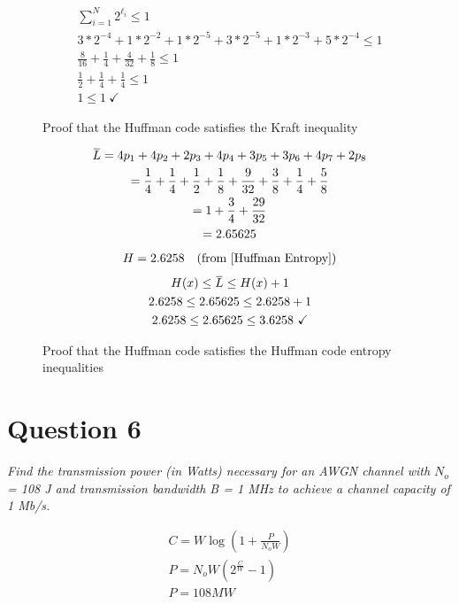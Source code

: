 \documentclass[12pt]{report}
\newcommand{\overbar}[1]{\mkern 1.5mu\overline{\mkern-1.5mu#1\mkern-1.5mu}\mkern 1.5mu} %
\begin{document}
\begin{figure}[H]
    \begin{gather}
        \sum_{i=1}^{N} 2^{\ell_i} \leq 1 \\
        3*2^{-4} + 1*2^{-2} + 1*2^{-5} + 3*2^{-5} + 1*2^{-3} + 5*2^{-4} \leq 1 \\
        \frac{8}{16} + \frac{1}{4} + \frac{4}{32} + \frac{1}{8} \leq 1 \\
        \frac{1}{2} + \frac{1}{4} + \frac{1}{4} \leq 1 \\
        1 \leq 1 \ \checkmark
    \end{gather}
    \caption{Proof that the Huffman code satisfies the Kraft inequality}
\end{figure}

\begin{figure}[H]
    \begin{gather}
        \overbar{L} = 4p_1 + 4p_2 + 2p_3 + 4p_4 + 3p_5 + 3p_6 + 4p_7 + 2p_8 \\
        = \frac{1}{4} + \frac{1}{4} + \frac{1}{2} + \frac{1}{8} + \frac{9}{32} + \frac{3}{8} + \frac{1}{4} + \frac{5}{8} \\
        = 1 + \frac{3}{4} + \frac{29}{32} \\
        = 2.65625
    \end{gather}
    \begin{gather*}
        H = 2.6258 \quad 
        (\text{from \ref{Huffman Entropy}})
    \end{gather*}
    \begin{gather}
        H(x) \leq \overbar{L} \leq H(x) + 1 \\
        2.6258 \leq 2.65625 \leq 2.6258 + 1 \\
        2.6258 \leq 2.65625 \leq 3.6258 \ \checkmark
    \end{gather}
    \caption{Proof that the Huffman code satisfies the Huffman code entropy inequalities}
\end{figure}


\section*{Question 6}
\textit{Find the transmission power (in Watts) necessary for an AWGN channel with $N_o$ = 108 J
and transmission bandwidth B = 1 MHz to achieve a channel capacity of 1 Mb/s.}

\begin{gather}
    C = W \log( 1 + \frac{P}{N_o W} ) \\
    P = N_o W( 2^{ \frac{C}{W} } - 1 ) \\
    P = 108MW
\end{gather}
\end{document}
